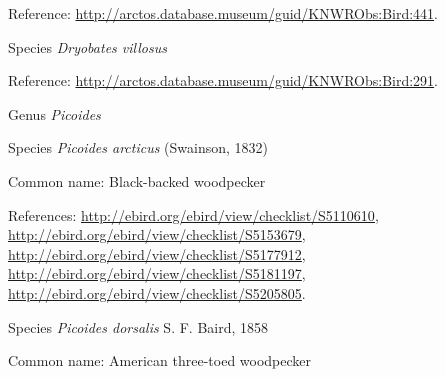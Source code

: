 \documentclass[9pt, article]{memoir}
\begin{document}
\begin{multicols}{2}
Reference: 
\url{http://arctos.database.museum/guid/KNWRObs:Bird:441}.

\vspace{6pt}\noindent\hspace{36pt}Species \textit{Dryobates villosus}


Reference: 
\url{http://arctos.database.museum/guid/KNWRObs:Bird:291}.

\vspace{6pt}\noindent\hspace{30pt}Genus \textit{Picoides}


\vspace{6pt}\noindent\hspace{36pt}Species \textit{Picoides arcticus} (Swainson, 1832)


Common name: Black-backed woodpecker

References: 
\url{http://ebird.org/ebird/view/checklist/S5110610}, 
\url{http://ebird.org/ebird/view/checklist/S5153679}, 
\url{http://ebird.org/ebird/view/checklist/S5177912}, 
\url{http://ebird.org/ebird/view/checklist/S5181197}, 
\url{http://ebird.org/ebird/view/checklist/S5205805}.

\vspace{6pt}\noindent\hspace{36pt}Species \textit{Picoides dorsalis} S. F. Baird, 1858


Common name: American three-toed woodpecker


\end{multicols}
\end{document}
